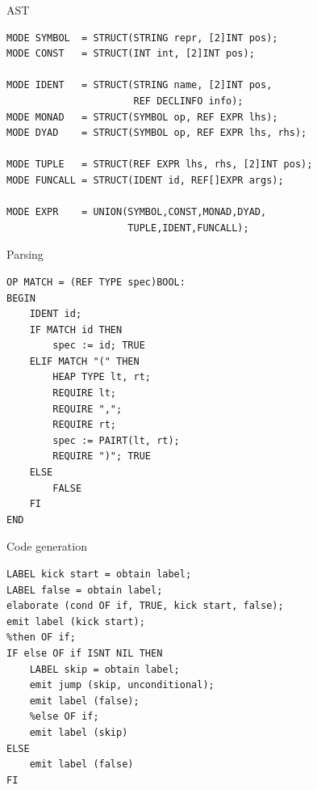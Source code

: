 \documentclass{beamer}
\begin{document}
\appendix
{}
\setcounter{finalframe}{\value{framenumber}}

\begin{frame}[fragile]
\begin{block}{AST}
\begin{lstlisting}
MODE SYMBOL  = STRUCT(STRING repr, [2]INT pos);
MODE CONST   = STRUCT(INT int, [2]INT pos);

MODE IDENT   = STRUCT(STRING name, [2]INT pos, 
                      REF DECLINFO info);
MODE MONAD   = STRUCT(SYMBOL op, REF EXPR lhs);
MODE DYAD    = STRUCT(SYMBOL op, REF EXPR lhs, rhs);

MODE TUPLE   = STRUCT(REF EXPR lhs, rhs, [2]INT pos);
MODE FUNCALL = STRUCT(IDENT id, REF[]EXPR args);

MODE EXPR    = UNION(SYMBOL,CONST,MONAD,DYAD,
                     TUPLE,IDENT,FUNCALL);
\end{lstlisting}
\end{block}
\end{frame}

\begin{frame}[fragile]
\begin{block}{Parsing}
\begin{lstlisting}
OP MATCH = (REF TYPE spec)BOOL:
BEGIN
    IDENT id;
    IF MATCH id THEN
        spec := id; TRUE
    ELIF MATCH "(" THEN
        HEAP TYPE lt, rt;
        REQUIRE lt;
        REQUIRE ",";
        REQUIRE rt;
        spec := PAIRT(lt, rt);
        REQUIRE ")"; TRUE
    ELSE
        FALSE
    FI
END
\end{lstlisting}
\end{block}
\end{frame}

\begin{frame}[fragile]
\begin{block}{Code generation}
\begin{lstlisting}
LABEL kick start = obtain label;
LABEL false = obtain label;
elaborate (cond OF if, TRUE, kick start, false);
emit label (kick start);
%then OF if;
IF else OF if ISNT NIL THEN
    LABEL skip = obtain label;
    emit jump (skip, unconditional);
    emit label (false);
    %else OF if;
    emit label (skip)
ELSE
    emit label (false)
FI
\end{lstlisting}
\end{block}
\end{frame}


\setcounter{framenumber}{\value{finalframe}}
\end{document}

